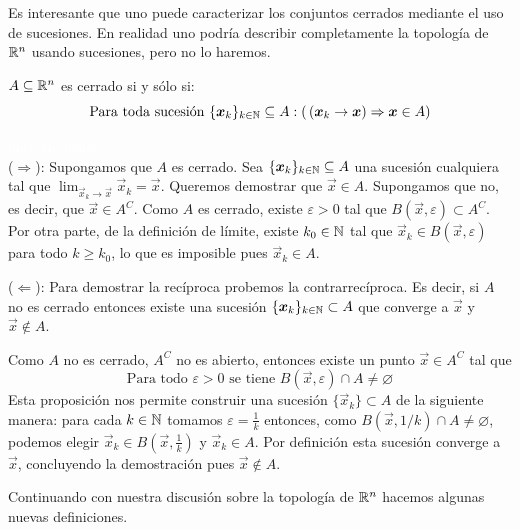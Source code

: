 Es interesante que uno puede caracterizar los conjuntos cerrados mediante el
uso de sucesiones. En realidad uno podr\'ia describir completamente
la topolog\'ia de 
$\mathbb{R}^n$ usando sucesiones, pero no lo haremos.
\begin{proposicion} $A\subseteq \mathbb{R}^n$ es cerrado si y s\'olo si:
$$
\text{Para toda sucesi\'on } \{\boldsymbol{x}_k\}_{k\in\mathbb{N}}\subseteq A : 
(\thinspace (\boldsymbol{x}_k\to \boldsymbol{x}) \Rightarrow \boldsymbol{x}\in A)
$$
\end{proposicion}

\begin{demostracion}
\textcolor{white}{linea en blanco}
\\($\Rightarrow$): Supongamos que $A$ es cerrado. Sea  
$\{\boldsymbol{x}_k\}_{k\in\mathbb{N}}\subseteq A$ una sucesi\'on cualquiera tal que
$\displaystyle \lim_{\vec{x}_k\to \vec{x}}\vec{x}_k=\vec{x}$. Queremos demostrar que $\vec{x}\in A$.
Supongamos que no, es decir, que $\vec{x}\in A^C$. Como $A$ es cerrado, existe
$\varepsilon>0$ tal que  $B(\vec{x},\varepsilon)\subset A^C$. 
Por otra parte, de la definici\'on de l\'imite, 
existe $k_0\in\mathbb{N}$ tal que $\vec{x}_k\in B(\vec{x},\varepsilon)$ para todo $k\ge k_0$, lo que
es imposible pues $\vec{x}_k\in A$.

\smallskip

($\Leftarrow$): Para demostrar la rec\'iproca probemos la contrarrec\'iproca.
Es decir, si $A$ no es cerrado entonces existe una sucesi\'on $\{\boldsymbol{x}_k\}_{k\in\mathbb{N}}
\subset A$
que converge a $\vec{x}$ y $\vec{x}\not \in A$.

Como $A$ no es cerrado, $A^C$ no es abierto, entonces existe un punto 
$\vec{x}\in A^C$ tal que
$$
\text{Para todo }\varepsilon>0 \text{ se tiene } B(\vec{x},\varepsilon)\cap A\not =\varnothing
$$
Esta proposici\'on nos permite construir una sucesi\'on $\{\vec{x}_k\}\subset A$
de la siguiente manera: para cada $k\in \mathbb{N}$  
tomamos $\varepsilon=\frac{1}{k}$ entonces, como $ B(\vec{x},1/k )\cap A\not 
=\varnothing$, podemos elegir $\vec{x}_k\in B(\vec{x},\frac{1}{k})$ y $\vec{x}_k\in A$. Por 
definici\'on esta sucesi\'on converge a $\vec{x}$, concluyendo la demostraci\'on pues 
$\vec{x}\not \in A$.
\end{demostracion}

Continuando con nuestra discusi\'on sobre la topolog\'ia de $\mathbb{R}^n$ hacemos
algunas nuevas definiciones.

